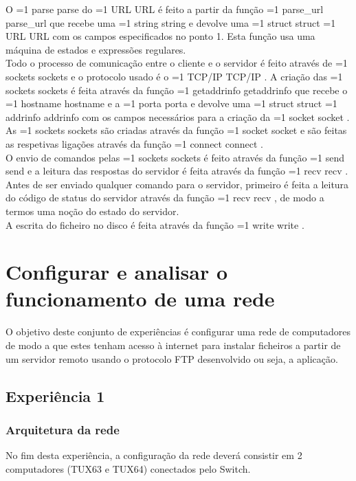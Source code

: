 \documentclass[11pt,a4paper]{article}
\newcommand{\hl}[2][1]{%
  \ifnum#1=1\relax
    \textcolor{text-hl1}{#2}%
  \else
    \textcolor{text-hl2}{#2}%
  \fi
}
\begin{document}
\begin{multicols}{2}
O \hl{parse} do \hl{URL} é feito a partir da função \hl[2]{parse\_url} que recebe uma \hl[2]{string} e devolve uma \hl[2]{struct} \hl{URL} com os campos especificados no ponto 1. Esta função usa uma máquina de estados e expressões regulares. \\
Todo o processo de comunicação entre o cliente e o servidor é feito através de \hl{sockets} e o protocolo usado é o \hl{TCP/IP}. A criação das \hl{sockets} é feita através da função \hl[2]{getaddrinfo} que recebe o \hl[2]{hostname} e a \hl[2]{porta} e devolve uma \hl[2]{struct} \hl{addrinfo} com os campos necessários para a criação da \hl{socket}. \\
As \hl[2]{sockets} são criadas através da função \hl{socket} e são feitas as respetivas ligações através da função \hl[2]{connect}. \\  
O envio de comandos pelas \hl[2]{sockets} é feito através da função \hl[2]{send} e a leitura das respostas do servidor é feita através da função \hl[2]{recv}. \\
Antes de ser enviado qualquer comando para o servidor, primeiro é feita a leitura do código de status do servidor através da função \hl[2]{recv}, de modo a termos uma noção do estado do servidor. \\
A escrita do ficheiro no disco é feita através da função \hl[2]{write}. \\

\section{Configurar e analisar o funcionamento de uma rede}

O objetivo deste conjunto de experiências é configurar uma rede de computadores de modo a que estes tenham acesso à internet para instalar ficheiros a partir de um servidor remoto usando o protocolo FTP desenvolvido ou seja, a aplicação.

\subsection{Experiência 1}

\subsubsection{Arquitetura da rede}
    
No fim desta experiência, a configuração da rede deverá consistir em 2 computadores (TUX63 e TUX64) conectados pelo Switch.


\end{multicols}
\end{document}
